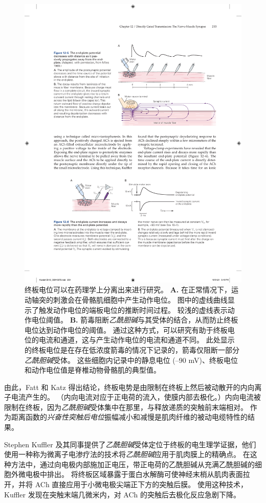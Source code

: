 \begin{figure}[htbp]
	\centering
	\includegraphics[width=0.8\linewidth]{chap12/fig_12_4}
	\caption{终板电位可以在药理学上分离出来进行研究。
		\textbf{A.} 在正常情况下，运动轴突的刺激会在骨骼肌细胞中产生动作电位。
		图中的虚线曲线显示了触发动作电位的端板电位的推断时间过程。
		较浅的虚线表示动作电位阈值。
		\textbf{B.} 箭毒阻断\textit{乙酰胆碱}与其受体的结合，从而防止终板电位达到动作电位的阈值。
		通过这种方式，可以研究有助于终板电位的电流和通道，这与产生动作电位的电流和通道不同。
		此处显示的终板电位是在存在低浓度箭毒的情况下记录的，箭毒仅阻断一部分\textit{乙酰胆碱}受体。
		这些细胞内记录中的静息电位 (–90 mV)、终板电位和动作电位值是脊椎动物骨骼肌的典型值。}
	\label{fig:12_4}
\end{figure}


由此，Fatt 和 Katz 得出结论，终板电势是由限制在终板上然后被动散开的内向离子电流产生的。
（内向电流对应于正电荷的流入，使膜内部去极化。）内向电流被限制在终板，因为\textit{乙酰胆碱}受体集中在那里，与释放递质的突触前末端相对。
作为距离函数的\textit{兴奋性突触后电位}振幅减小和减慢是肌肉纤维的被动电缆特性的结果。


Stephen Kuffler 及其同事提供了\textit{乙酰胆碱}受体定位于终板的电生理学证据，他们使用一种称为微离子电渗疗法的技术将\textit{乙酰胆碱}应用于肌肉膜上的精确点。
在这种方法中，通过向电极内部施加正电压，带正电荷的乙酰胆碱从充满乙酰胆碱的细胞外微电极中排出。
将终板区域暴露于蛋白水解酶可使神经末梢从肌肉表面拉开，并将 ACh 直接应用于小微电极尖端正下方的突触后膜。
使用这种技术，Kuffler 发现在突触末端几微米内，对 ACh 的突触后去极化反应急剧下降。


